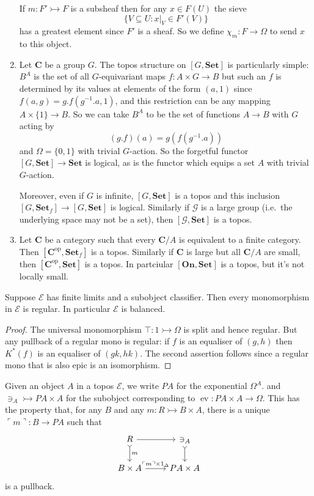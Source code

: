 \documentclass[a4paper]{article}
\renewcommand{\c}[1]{\mathbf{#1}}
\newcommand{\Set}{{\c{Set}}}
\newcommand{\mono}{\rightarrowtail}
\DeclareMathOperator{\ev}{ev} %
\begin{document}
\begin{eg}
\begin{enumerate}
    If \(m: F' \mono F\) is a subsheaf then for any \(x \in F(U)\) the sieve
    \[
      \{V \subseteq U: x|_V \in F'(V)\}
    \]
    has a greatest element since \(F'\) is a sheaf. So we define \(\chi_m: F \to \Omega\) to send \(x\) to this object.
  \item Let \(\c C\) be a group \(G\). The topos structure on \([G, \Set]\) is particularly simple: \(B^A\) is the set of all \(G\)-equivariant maps \(f: A \times G \to B\) but such an \(f\) is determined by its values at elements of the form \((a, 1)\) since \(f(a, g) = g . f(g^{-1} . a, 1)\), and this restriction can be any mapping \(A \times \{1\} \to B\). So we can take \(B^A\) to be the set of functions \(A \to B\) with \(G\) acting by
    \[
      (g . f) (a) = g(f(g^{-1} . a))
    \]
    and \(\Omega = \{0, 1\}\) with trivial \(G\)-action. So the forgetful functor \([G, \Set] \to \Set\) is logical, as is the functor which equips a set \(A\) with trivial \(G\)-action.

    Moreover, even if \(G\) is infinite, \([G, \Set]\) is a topos and this inclusion \([G, \Set_f] \to [G, \Set]\) is logical. Similarly if \(\mathcal G\) is a large group (i.e.\ the underlying space may not be a set), then \([\mathcal G, \Set]\) is a topos.
  \item Let \(\c C\) be a category such that every \(\c C/A\) is equivalent to a finite category. Then \([\c C^{\text{op}}, \Set_f]\) is a topos. Similarly if \(\c C\) is large but all \(\c C/A\) are small, then \([\c C^{\text{op}}, \Set]\) is a topos. In partciular \([\c{On}, \Set]\) is a topos, but it's not locally small.
  \end{enumerate}
\end{eg}

\begin{lemma}
  Suppose \(\mathcal E\) has finite limits and a subobject classifier. Then every monomorphism in \(\mathcal E\) is regular. In particular \(\mathcal E\) is balanced.
\end{lemma}

\begin{proof}
  The universal monomorphism \(\top: 1 \mono \Omega\) is split and hence regular. But any pullback of a regular mono is regular: if \(f\) is an equaliser of \((g, h)\) then \(K^*(f)\) is an equaliser of \((gk, hk)\). The second assertion follows since a regular mono that is also epic is an isomorphism.
\end{proof}

Given an object \(A\) in a topos \(\mathcal E\), we write \(PA\) for the exponential \(\Omega^A\). and \(\ni_A \mono PA \times A\) for the subobject corresponding to \(\ev: PA \times A \to \Omega\). This has the property that, for any \(B\) and any \(m: R \mono B \times A\), there is a unique \(\ulcorner m \urcorner: B \to PA\) such that
\[
  \begin{tikzcd}
    R \ar[r] \ar[d, "m", tail] & \ni_A \ar[d, tail] \\
    B \times A \ar[r, "\ulcorner m \urcorner \times 1_\Delta"] & PA \times A
  \end{tikzcd}
\]
is a pullback.
\end{document}
